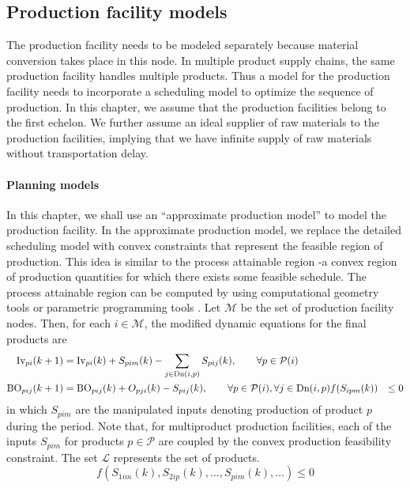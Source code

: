 \subsection*{Production facility models}

The production facility needs to be modeled separately because
material conversion takes place in this node. %
 In multiple product supply chains, the same production
facility handles multiple products. Thus a model for the production
facility needs to incorporate a scheduling model to optimize the
sequence of production. In this chapter, we assume that the production
facilities belong to  the first echelon. We further assume an ideal
supplier of raw materials to the production facilities, implying that
we have infinite supply of raw materials without transportation
delay. 

\paragraph{Planning models}
In this chapter, we shall use an ``approximate production model'' to 
model the production facility. In the approximate production model, we replace 
the detailed scheduling model with convex constraints that represent
the feasible region of production. This idea is similar to the process
attainable region \citep{sung:maravelias:2007}-a convex region of production
quantities for which there exists some feasible schedule. The process
attainable region can be computed by using computational geometry tools
\citep{sung:maravelias:2007, maravelias:sung:2009,
  sung:maravelias:2009} or parametric programming tools
\citep{li:ierapetritou:2010}. 
Let $\mathcal{M}$ be the set of production facility nodes. Then, for each $i \in \mathcal{M}$, the modified
dynamic equations for the final products are
\begin{align*}
\textrm{Iv}_{pi}(k+1) &= \textrm{Iv}_{pi}(k)+ S_{pim}(k) -\sum_{j \in
  \textrm{Dn}(i,p)}S_{pij}(k), \qquad \forall p \in \mathcal{P}(i)\\
\textrm{BO}_{pij}(k+1) &= \textrm{BO}_{pij}(k) + O_{pji}(k) -S_{pij}(k),\qquad \forall
p \in \mathcal{P}(i), \forall j \in \textrm{Dn}(i,p)
f(S_{ipm}(k)) &\leq 0
\end{align*}
in which $S_{pim}$ are the manipulated inputs denoting production of
product $p$  during the period. 
Note that, for multiproduct production facilities, each of the inputs
$S_{pim}$ for products $p \in \mathcal{P}$ are coupled by the
convex production feasibility constraint. The set $\mathcal{L}$
represents the set of products. 
\begin{equation*}
f(S_{1im}(k),S_{2ip}(k),\ldots,S_{pim}(k),\ldots) \leq 0
\end{equation*}


